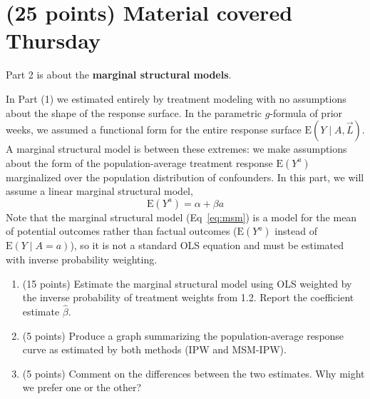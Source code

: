 \documentclass[10pt]{article}
\newcommand{\E}{\textrm{E}}
\begin{document}
\section{(25 points) Material covered Thursday}
Part 2 is about the \textbf{marginal structural models}.

In Part (1) we estimated entirely by treatment modeling with no assumptions about the shape of the response surface. In the parametric $g$-formula of prior weeks, we assumed a functional form for the entire response surface $\E(Y\mid A,\vec{L})$. A marginal structural model is between these extremes: we make assumptions about the form of the population-average treatment response $\E(Y^a)$ marginalized over the population distribution of confounders. In this part, we will assume a linear marginal structural model,
\begin{equation}
    \E(Y^a) = \alpha + \beta a \label{eq:msm}
\end{equation}
Note that the marginal structural model (Eq~\ref{eq:msm}) is a model for the mean of potential outcomes rather than factual outcomes ($\E(Y^a)$ instead of $\E(Y\mid A = a)$), so it is not a standard OLS equation and must be estimated with inverse probability weighting.

\begin{enumerate}
    \item (15 points) Estimate the marginal structural model using OLS weighted by the inverse probability of treatment weights from 1.2. Report the coefficient estimate $\hat\beta$.
    \item (5 points) Produce a graph summarizing the population-average response curve as estimated by both methods (IPW and MSM-IPW).
    \item (5 points) Comment on the differences between the two estimates. Why might we prefer one or the other?
\end{enumerate}
\end{document}
